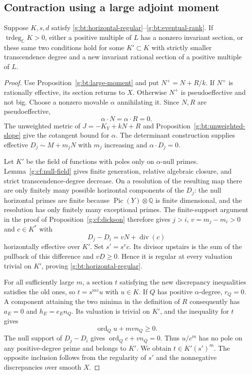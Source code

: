 \subsection{Contraction using a large adjoint moment}
\label{g:ba:eventual}

\begin{proposition}\label{g:ba:eventual-contraction}
Suppose $K,s,d$ satisfy
\eqref{g:bt:horizontal-regular}--\eqref{g:bt:eventual-rank}.
If $\operatorname{trdeg}_{\mathbb C}K>0$, either a positive multiple of
$L$ has a nonzero invariant section, or these same two conditions hold
for some $K'\subset K$ with strictly smaller transcendence degree and a
new invariant rational section of a positive multiple of $L$.
\end{proposition}

\begin{proof}
Use Proposition~\ref{g:bt:large-moment} and put $N^+=N+R/k$.
If $N^+$ is rationally effective, its section returns to $X$.
Otherwise $N^+$ is pseudoeffective and not big.  Choose a nonzero
movable $\alpha$ annihilating it.  Since $N,R$ are pseudoeffective,
\[
                         \alpha\cdot N=\alpha\cdot R=0.
\]
The unweighted metric of $J=-K_Y+kN+R$ and
Proposition~\ref{g:bt:unweighted-slope} give the cotangent bound for
$\alpha$.  The determinant construction supplies effective
$D_j\sim M+m_jN$ with $m_j$ increasing and $\alpha\cdot D_j=0$.

Let $K'$ be the field of functions with poles only on $\alpha$-null
primes.  Lemma~\ref{g:cf:null-field} gives finite generation, relative
algebraic closure, and strict transcendence-degree decrease.
On a resolution of the resulting map there are only finitely many
possible horizontal components of the $D_j$: the null horizontal primes
are finite because $\operatorname{Pic}(Y)\otimes\mathbb Q$ is finite
dimensional, and the resolution has only finitely many exceptional
primes.  The finite-support argument in the proof of Proposition~\ref{g:cf:dickson}
therefore gives $j>i$, $v=m_j-m_i>0$ and $c\in K^*$ with
\[
             D_j-D_i=vN+\operatorname{div}(c)
\]
horizontally effective over $K'$.
Set $s'=s^vc$.  Its divisor upstairs is the sum of the pullback of this
difference and $vD\geq0$.  Hence it is regular at every valuation
trivial on $K'$, proving \eqref{g:bt:horizontal-regular}.

For all sufficiently large $m$, a section $t$ satisfying the new
discrepancy inequalities satisfies the old ones, so
$t=s^{mv}u$ with $u\in K$.  If $Q$ has positive $\alpha$-degree,
$r_Q=0$.  A component attaining the two minima in the definition of
$R$ consequently has $a_E=0$ and $h_E=e_En_Q$.
Its valuation is trivial on $K'$, and the inequality for $t$ gives
\[
                       \operatorname{ord}_Q u+mv n_Q\geq0.
\]
The null support of $D_j-D_i$ gives
$\operatorname{ord}_Q c+v n_Q=0$.
Thus $u/c^m$ has no pole on any positive-degree prime and belongs to
$K'$.  We obtain $t\in K'(s')^m$.
The opposite inclusion follows from the regularity of $s'$ and the
nonnegative discrepancies over smooth $X$.
\end{proof}

